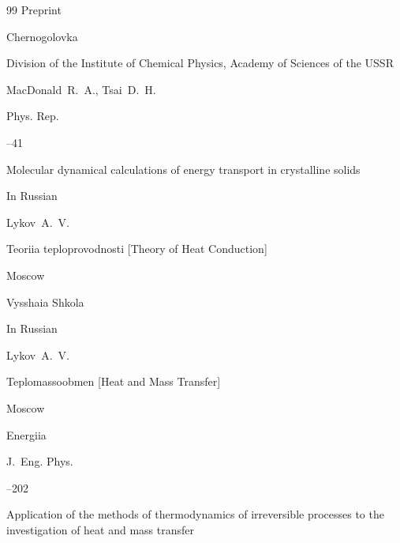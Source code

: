 \begin{thebibliography}{99}
\preprintinfo Preprint

\publaddr Chernogolovka

\publ Division of the Institute of Chemical Physics, Academy of Sciences of the USSR










\by MacDonald~R.~A., Tsai~D.~H.

\jour Phys. Rep.




--41

\paper Molecular dynamical calculations of energy transport in crystalline solids







\lang In Russian

\by  Lykov~A.~V.

\book Teoriia teploprovodnosti \rm [Theory of Heat Conduction]

\publaddr Moscow

\publ Vysshaia Shkola






\lang In Russian

\by  Lykov~A.~V.

\book Teplomassoobmen \rm [Heat and Mass Transfer]

\publaddr Moscow

\publ Energiia 






\jour J.~Eng. Phys. 




–202 

\paper Application of the methods of thermodynamics of irreversible processes to the investigation of heat and mass transfer


\end{thebibliography}
